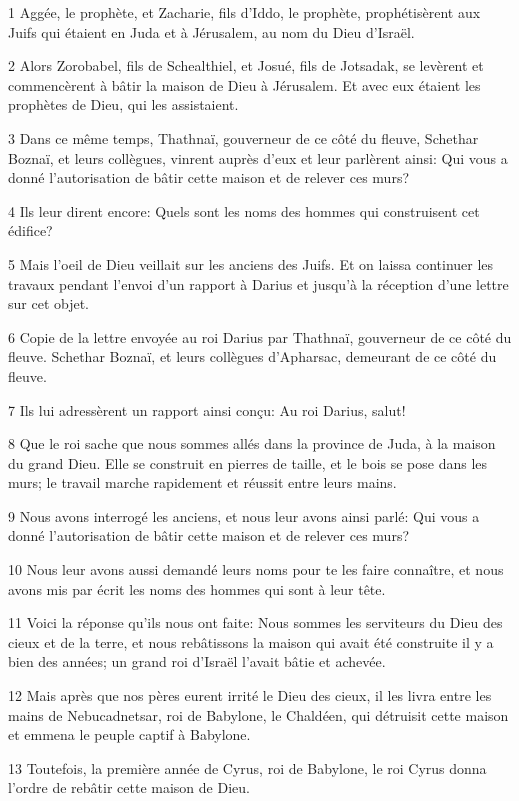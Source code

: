 \par 1 Aggée, le prophète, et Zacharie, fils d'Iddo, le prophète, prophétisèrent aux Juifs qui étaient en Juda et à Jérusalem, au nom du Dieu d'Israël.
\par 2 Alors Zorobabel, fils de Schealthiel, et Josué, fils de Jotsadak, se levèrent et commencèrent à bâtir la maison de Dieu à Jérusalem. Et avec eux étaient les prophètes de Dieu, qui les assistaient.
\par 3 Dans ce même temps, Thathnaï, gouverneur de ce côté du fleuve, Schethar Boznaï, et leurs collègues, vinrent auprès d'eux et leur parlèrent ainsi: Qui vous a donné l'autorisation de bâtir cette maison et de relever ces murs?
\par 4 Ils leur dirent encore: Quels sont les noms des hommes qui construisent cet édifice?
\par 5 Mais l'oeil de Dieu veillait sur les anciens des Juifs. Et on laissa continuer les travaux pendant l'envoi d'un rapport à Darius et jusqu'à la réception d'une lettre sur cet objet.
\par 6 Copie de la lettre envoyée au roi Darius par Thathnaï, gouverneur de ce côté du fleuve. Schethar Boznaï, et leurs collègues d'Apharsac, demeurant de ce côté du fleuve.
\par 7 Ils lui adressèrent un rapport ainsi conçu: Au roi Darius, salut!
\par 8 Que le roi sache que nous sommes allés dans la province de Juda, à la maison du grand Dieu. Elle se construit en pierres de taille, et le bois se pose dans les murs; le travail marche rapidement et réussit entre leurs mains.
\par 9 Nous avons interrogé les anciens, et nous leur avons ainsi parlé: Qui vous a donné l'autorisation de bâtir cette maison et de relever ces murs?
\par 10 Nous leur avons aussi demandé leurs noms pour te les faire connaître, et nous avons mis par écrit les noms des hommes qui sont à leur tête.
\par 11 Voici la réponse qu'ils nous ont faite: Nous sommes les serviteurs du Dieu des cieux et de la terre, et nous rebâtissons la maison qui avait été construite il y a bien des années; un grand roi d'Israël l'avait bâtie et achevée.
\par 12 Mais après que nos pères eurent irrité le Dieu des cieux, il les livra entre les mains de Nebucadnetsar, roi de Babylone, le Chaldéen, qui détruisit cette maison et emmena le peuple captif à Babylone.
\par 13 Toutefois, la première année de Cyrus, roi de Babylone, le roi Cyrus donna l'ordre de rebâtir cette maison de Dieu.
